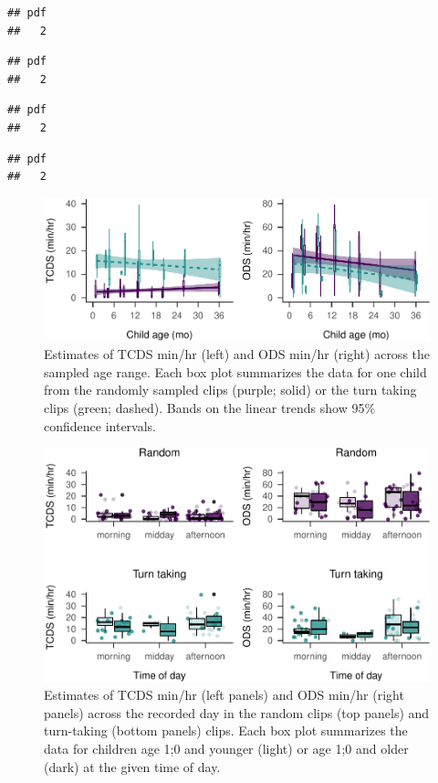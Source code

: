 \documentclass[,man,floatsintext]{apa6}
\begin{document}
\begin{verbatim}
## pdf 
##   2
\end{verbatim}

\begin{verbatim}
## pdf 
##   2
\end{verbatim}

\begin{verbatim}
## pdf 
##   2
\end{verbatim}

\begin{verbatim}
## pdf 
##   2
\end{verbatim}

\begin{figure}
\centering
\includegraphics{Yeli-CLE_files/figure-latex/fig3-1.pdf}
\caption{\label{fig:fig3}Estimates of TCDS min/hr (left) and ODS min/hr
(right) across the sampled age range. Each box plot summarizes the data
for one child from the randomly sampled clips (purple; solid) or the
turn taking clips (green; dashed). Bands on the linear trends show 95\%
confidence intervals.}
\end{figure}

\begin{figure}
\centering
\includegraphics{Yeli-CLE_files/figure-latex/fig5-1.pdf}
\caption{\label{fig:fig5}Estimates of TCDS min/hr (left panels) and ODS
min/hr (right panels) across the recorded day in the random clips (top
panels) and turn-taking (bottom panels) clips. Each box plot summarizes
the data for children age 1;0 and younger (light) or age 1;0 and older
(dark) at the given time of day.}
\end{figure}
\end{document}
